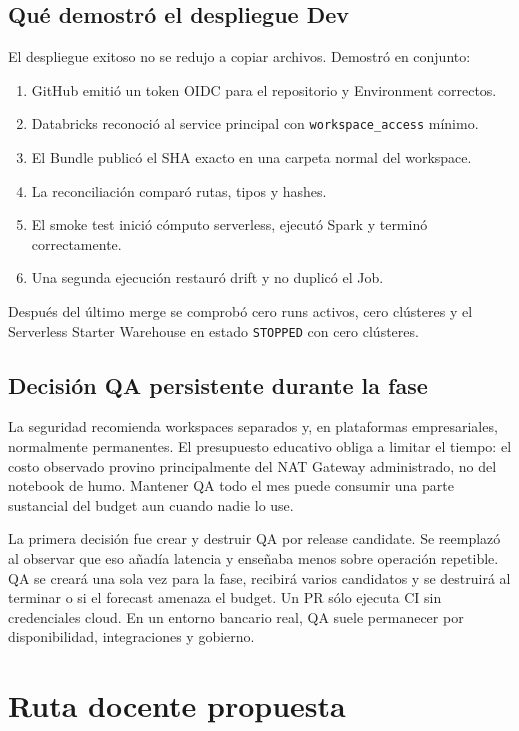 \documentclass[11pt,a4paper]{article}
\begin{document}
\subsection{Qué demostró el despliegue Dev}

El despliegue exitoso no se redujo a copiar archivos. Demostró en conjunto:

\begin{enumerate}
  \item GitHub emitió un token OIDC para el repositorio y Environment correctos.
  \item Databricks reconoció al service principal con \texttt{workspace\_access} mínimo.
  \item El Bundle publicó el SHA exacto en una carpeta normal del workspace.
  \item La reconciliación comparó rutas, tipos y hashes.
  \item El smoke test inició cómputo serverless, ejecutó Spark y terminó correctamente.
  \item Una segunda ejecución restauró drift y no duplicó el Job.
\end{enumerate}

Después del último merge se comprobó cero runs activos, cero clústeres y el Serverless Starter
Warehouse en estado \texttt{STOPPED} con cero clústeres.

\subsection{Decisión QA persistente durante la fase}

La seguridad recomienda workspaces separados y, en plataformas empresariales, normalmente
permanentes. El presupuesto educativo obliga a limitar el tiempo: el costo observado provino
principalmente del NAT Gateway administrado, no del notebook de humo. Mantener QA todo el mes puede
consumir una parte sustancial del budget aun cuando nadie lo use.

La primera decisión fue crear y destruir QA por release candidate. Se reemplazó al observar que eso
añadía latencia y enseñaba menos sobre operación repetible. QA se creará una sola vez para la fase,
recibirá varios candidatos y se destruirá al terminar o si el forecast amenaza el budget. Un PR sólo
ejecuta CI sin credenciales cloud. En un entorno bancario real, QA suele permanecer por disponibilidad,
integraciones y gobierno.

\section{Ruta docente propuesta}
\end{document}
